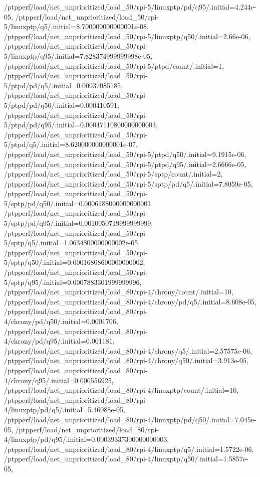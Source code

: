 {    /ptpperf/load/net_unprioritized/load_50/rpi-5/linuxptp/pd/q95/.initial=4.244e-05,
    /ptpperf/load/net_unprioritized/load_50/rpi-5/linuxptp/q5/.initial=8.700000000000001e-08,
    /ptpperf/load/net_unprioritized/load_50/rpi-5/linuxptp/q50/.initial=2.66e-06,
    /ptpperf/load/net_unprioritized/load_50/rpi-5/linuxptp/q95/.initial=7.828374999999998e-05,
    /ptpperf/load/net_unprioritized/load_50/rpi-5/ptpd/count/.initial=1,
    /ptpperf/load/net_unprioritized/load_50/rpi-5/ptpd/pd/q5/.initial=0.00037085185,
    /ptpperf/load/net_unprioritized/load_50/rpi-5/ptpd/pd/q50/.initial=0.000410591,
    /ptpperf/load/net_unprioritized/load_50/rpi-5/ptpd/pd/q95/.initial=0.00047110800000000003,
    /ptpperf/load/net_unprioritized/load_50/rpi-5/ptpd/q5/.initial=8.620000000000001e-07,
    /ptpperf/load/net_unprioritized/load_50/rpi-5/ptpd/q50/.initial=9.1915e-06,
    /ptpperf/load/net_unprioritized/load_50/rpi-5/ptpd/q95/.initial=2.6666e-05,
    /ptpperf/load/net_unprioritized/load_50/rpi-5/sptp/count/.initial=2,
    /ptpperf/load/net_unprioritized/load_50/rpi-5/sptp/pd/q5/.initial=7.8059e-05,
    /ptpperf/load/net_unprioritized/load_50/rpi-5/sptp/pd/q50/.initial=0.0006188000000000001,
    /ptpperf/load/net_unprioritized/load_50/rpi-5/sptp/pd/q95/.initial=0.0010050719999999999,
    /ptpperf/load/net_unprioritized/load_50/rpi-5/sptp/q5/.initial=1.0634800000000002e-05,
    /ptpperf/load/net_unprioritized/load_50/rpi-5/sptp/q50/.initial=0.00016808600000000002,
    /ptpperf/load/net_unprioritized/load_50/rpi-5/sptp/q95/.initial=0.0007883301999999996,
    /ptpperf/load/net_unprioritized/load_80/rpi-4/chrony/count/.initial=10,
    /ptpperf/load/net_unprioritized/load_80/rpi-4/chrony/pd/q5/.initial=8.608e-05,
    /ptpperf/load/net_unprioritized/load_80/rpi-4/chrony/pd/q50/.initial=0.0001706,
    /ptpperf/load/net_unprioritized/load_80/rpi-4/chrony/pd/q95/.initial=0.001181,
    /ptpperf/load/net_unprioritized/load_80/rpi-4/chrony/q5/.initial=2.57575e-06,
    /ptpperf/load/net_unprioritized/load_80/rpi-4/chrony/q50/.initial=3.913e-05,
    /ptpperf/load/net_unprioritized/load_80/rpi-4/chrony/q95/.initial=0.000556925,
    /ptpperf/load/net_unprioritized/load_80/rpi-4/linuxptp/count/.initial=10,
    /ptpperf/load/net_unprioritized/load_80/rpi-4/linuxptp/pd/q5/.initial=5.46088e-05,
    /ptpperf/load/net_unprioritized/load_80/rpi-4/linuxptp/pd/q50/.initial=7.045e-05,
    /ptpperf/load/net_unprioritized/load_80/rpi-4/linuxptp/pd/q95/.initial=0.00039337300000000003,
    /ptpperf/load/net_unprioritized/load_80/rpi-4/linuxptp/q5/.initial=1.5722e-06,
    /ptpperf/load/net_unprioritized/load_80/rpi-4/linuxptp/q50/.initial=1.5857e-05,
}
